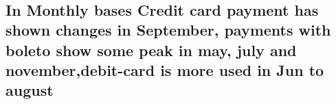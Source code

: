 \documentclass[11pt]{article}
\begin{document}
    \begin{center}
    \end{center}
    { \hspace*{\fill} \\}
    
    \begin{center}
    \end{center}
    { \hspace*{\fill} \\}
    
    \begin{center}
    \end{center}
    { \hspace*{\fill} \\}
    
    \begin{center}
    \end{center}
    { \hspace*{\fill} \\}
    
    \hypertarget{in-monthly-bases-credit-card-payment-has-shown-changes-in-september-payments-with-boleto-show-some-peak-in-may-july-and-novemberdebit-card-is-more-used-in-jun-to-august}{%
\subsection{In Monthly bases Credit card payment has shown changes in
September, payments with boleto show some peak in may, july and
november,debit-card is more used in Jun to
august}\label{in-monthly-bases-credit-card-payment-has-shown-changes-in-september-payments-with-boleto-show-some-peak-in-may-july-and-novemberdebit-card-is-more-used-in-jun-to-august}}
\end{document}
